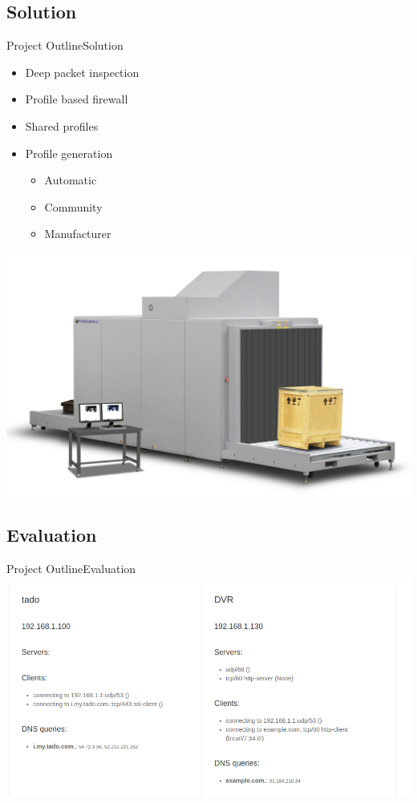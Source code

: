 \subsection{Solution}
\begin{frame}{Project Outline}{Solution}
\begin{minipage}{0.48\textwidth}
\begin{itemize}
	\item Deep packet inspection
	\item Profile based firewall
	\item Shared profiles
	\item Profile generation
	\begin{itemize}
		\item Automatic
		\item Community
		\item Manufacturer
	\end{itemize}

\end{itemize}

\end{minipage}
\hfill
\begin{minipage}{0.48\textwidth}
	\includegraphics[width=1\textwidth]{figs/xray}
	
\end{minipage}



\end{frame}
\subsection{Evaluation}
\begin{frame}{Project Outline}{Evaluation}
\includegraphics[width=1\textwidth]{figs/screenshot.png}
\end{frame}
